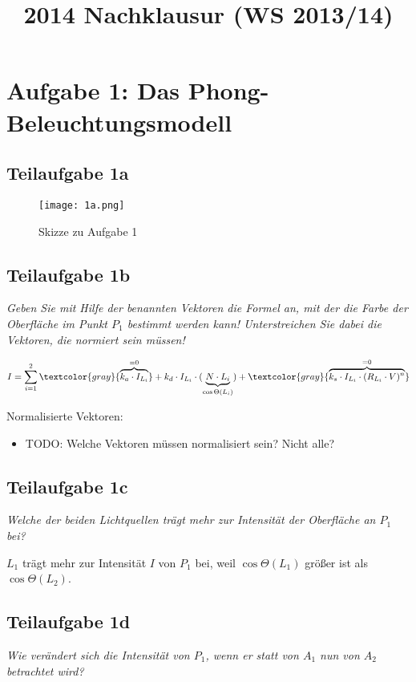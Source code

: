 \documentclass[a4paper]{scrartcl}
\begin{document}
\title{2014 Nachklausur (WS 2013/14)}

\setcounter{section}{1}
\section*{Aufgabe 1: Das Phong-Beleuchtungsmodell}
\subsection*{Teilaufgabe 1a}
\begin{figure}[h]
    \centering
    \texttt{[image: 1a.png]}
    \caption{Skizze zu Aufgabe 1}
    \label{fig:1a}
\end{figure}

\subsection*{Teilaufgabe 1b}
\textit{Geben Sie mit Hilfe der benannten Vektoren die Formel an, mit der die
Farbe der Oberfläche im Punkt $P_1$ bestimmt werden kann! Unterstreichen Sie
dabei die Vektoren, die normiert sein müssen!}

\[I = \sum_{i=1}^2 \textcolor{gray}{\overbrace{k_a \cdot I_{L_i}}^{=0}} + k_d \cdot I_{L_i} \cdot (\underbrace{N \cdot L_{i}}_{\cos \Theta({L_i})}) + \textcolor{gray}{\overbrace{k_s \cdot I_{L_i} \cdot (R_{L_i} \cdot V)^n}^{=0}}\]

Normalisierte Vektoren:

\begin{itemize}
    \item TODO: Welche Vektoren müssen normalisiert sein? Nicht alle?
\end{itemize}


\subsection*{Teilaufgabe 1c}
\textit{Welche der beiden Lichtquellen trägt mehr zur Intensität der Oberfläche
an $P_1$ bei?}

$L_1$ trägt mehr zur Intensität $I$ von $P_1$ bei, weil $\cos \Theta(L_1)$ größer
ist als  $\cos \Theta(L_2)$.

\subsection*{Teilaufgabe 1d}
\textit{Wie verändert sich die Intensität von $P_1$, wenn er statt von $A_1$
nun von $A_2$ betrachtet wird?}
\end{document}
